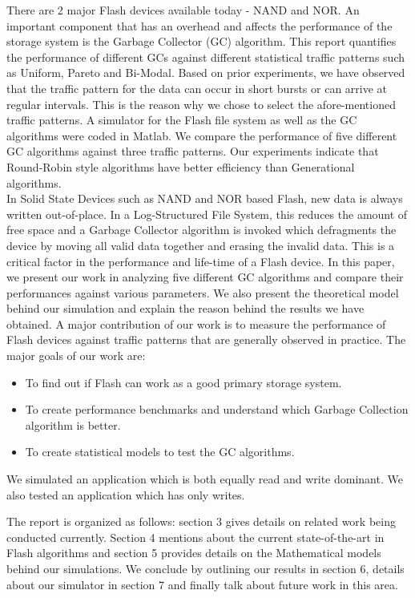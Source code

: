 \documentclass[11pt]{report} %
\begin{document}
There are 2 major Flash devices available today - NAND and NOR.
An important component that has an overhead and affects the performance of the storage system is the Garbage Collector (GC) algorithm. This report quantifies the performance of different GCs against different statistical traffic patterns such as Uniform, Pareto and Bi-Modal. Based on prior experiments, we have observed that the traffic pattern for the data can occur in short bursts or can arrive at regular intervals. This is the reason why we chose to select the afore-mentioned traffic patterns. A simulator for the Flash file system as well as the GC algorithms were coded in Matlab. We compare the performance of five different GC algorithms against three traffic patterns. Our experiments indicate that Round-Robin style algorithms have better efficiency than Generational algorithms.\\

In Solid State Devices such as NAND and NOR based Flash, new data is always written out-of-place. In a Log-Structured File System, this reduces the amount of free space and a Garbage Collector algorithm is invoked which defragments the device by moving all valid data together and erasing the invalid data. This is a critical factor in the performance and life-time of a Flash device. In this paper, we present our work in analyzing five different GC algorithms and compare their performances against various parameters. We also present the theoretical model behind our simulation and explain the reason behind the results we have obtained. A major contribution of our work is to measure the performance of Flash devices against traffic patterns that are generally observed in practice.
The major goals of our work are:
\begin{itemize}
\item To find out if Flash can work as a good primary storage system. 
\item To create performance benchmarks and understand which Garbage Collection algorithm is better. 
\item To create statistical models to test the GC algorithms.
\end{itemize}

We simulated an application which is both equally read and write dominant. We also tested an application which has only writes.

The report is organized as follows: section 3 gives details on related work being conducted currently. Section 4 mentions about the current state-of-the-art in Flash algorithms and section 5 provides details on the Mathematical models behind our simulations. We conclude by outlining our results in section 6, details about our simulator in section 7 and finally talk about future work in this area.
\end{document}
